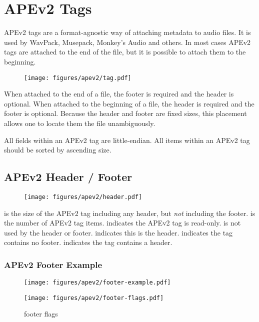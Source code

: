 
\chapter{APEv2 Tags}
\label{apev2}
APEv2 tags are a format-agnostic way of attaching metadata to audio files.
It is used by WavPack, Musepack, Monkey's Audio and others.
In most cases APEv2 tags are attached to the end of the file,
but it is possible to attach them to the beginning.

\begin{figure}[h]
  \texttt{[image: figures/apev2/tag.pdf]}
\end{figure}
\par
\noindent
When attached to the end of a file, the footer is required
and the header is optional.
When attached to the beginning of a file, the header is required
and the footer is optional.
Because the header and footer are fixed sizes,
this placement allows one to locate them the file
unambiguously.

All fields within an APEv2 tag are little-endian.
All items within an APEv2 tag should be sorted
by ascending size.

\clearpage

\section{APEv2 Header / Footer}
\begin{figure}[h]
  \texttt{[image: figures/apev2/header.pdf]}
\end{figure}
\par
\noindent
{} is the size of the APEv2 tag including
any header, but \textit{not} including the footer.
 is the number of APEv2 tag items.
 indicates the APEv2 tag is read-only.
 is not used by the header or footer.
 indicates this is the header.
 indicates the tag contains no footer.
 indicates the tag contains a header.

\subsection{APEv2 Footer Example}
\begin{figure}[h]
  \texttt{[image: figures/apev2/footer-example.pdf]}
\end{figure}
\begin{figure}[h]
  \texttt{[image: figures/apev2/footer-flags.pdf]}
  \caption{footer flags}
\end{figure}

